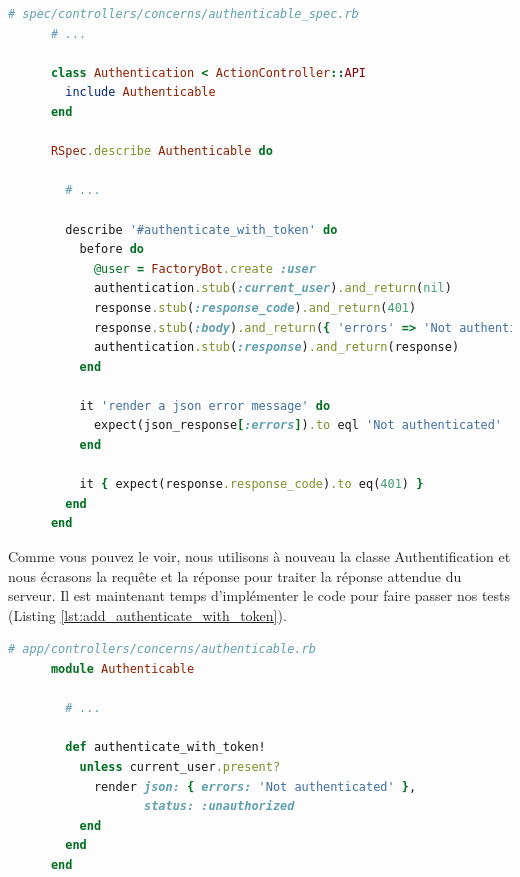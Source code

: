 \documentclass[]{report}
\begin{document}
    \begin{scriptsize}
      \begin{lstlisting}[language=ruby, label={lst:add_authenticate_with_token_test}, caption={Test de l'authentification par la méthode de jeton}]
      # spec/controllers/concerns/authenticable_spec.rb
      # ...

      class Authentication < ActionController::API
        include Authenticable
      end

      RSpec.describe Authenticable do

        # ...

        describe '#authenticate_with_token' do
          before do
            @user = FactoryBot.create :user
            authentication.stub(:current_user).and_return(nil)
            response.stub(:response_code).and_return(401)
            response.stub(:body).and_return({ 'errors' => 'Not authenticated' }.to_json)
            authentication.stub(:response).and_return(response)
          end

          it 'render a json error message' do
            expect(json_response[:errors]).to eql 'Not authenticated'
          end

          it { expect(response.response_code).to eq(401) }
        end
      end
      \end{lstlisting}
    \end{scriptsize}


    Comme vous pouvez le voir, nous utilisons à nouveau la classe Authentification et nous écrasons la requête et la réponse pour traiter la réponse attendue du serveur. Il est maintenant temps d'implémenter le code pour faire passer nos tests (Listing \ref{lst:add_authenticate_with_token}).

    \begin{scriptsize}
      \begin{lstlisting}[language=ruby, label={lst:add_authenticate_with_token}, caption={Ajout de l'authentification par la méthode de jeton}]
      # app/controllers/concerns/authenticable.rb
      module Authenticable

        # ...

        def authenticate_with_token!
          unless current_user.present?
            render json: { errors: 'Not authenticated' },
                   status: :unauthorized
          end
        end
      end
      \end{lstlisting}
    \end{scriptsize}
\end{document}
